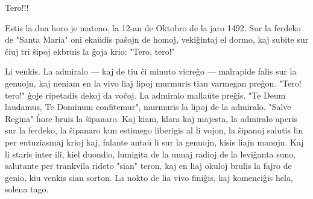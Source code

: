    Tero!!!

   Estis la dua horo je mateno, la 12-an de Oktobro de la jaro 1492. Sur
la ferdeko de "Santa Maria" oni eka\u udis pa\^sojn de homoj,
veki\^gintaj el dormo, kaj subite sur \^ciuj tri \^sipoj ekbruis la
\^goja krio: "Tero, tero!"

   Li venkis. La admiralo --- kaj de tiu \^ci minuto vicre\^go --- malrapide
falis sur la genuojn, kaj neniam en la vivo liaj lipoj murmuris tian
varmegan pre\^gon. "Tero! tero!" \^goje ripetadis dekoj da
vo\^coj. La admiralo malla\u ute pre\^gis. "Te Deum laudamus, Te
Dominum confitemur", murmuris la lipoj de la admiralo. "Salve
Regina" \^hore bruis la \^sipanaro. Kaj kiam, klara kaj majesta, la
admiralo aperis sur la ferdeko, la \^sipanaro kun estimego liberigis
al li vojon, la \^sipanoj salutis lin per entuziasmaj krioj kaj,
falante anta\u u li sur la genuojn, kisis liajn manojn. Kaj li
staris inter ili, kiel duondio, lumigita de la unuaj radioj de la
levi\^ganta suno, salutante per trankvila rideto "sian" teron, kaj
en liaj okuloj brulis la fajro de genio, kiu venkis sian sorton. La
nokto de lia vivo fini\^gis, kaj komenci\^gis hela, solena tago.

\smallrule{}
